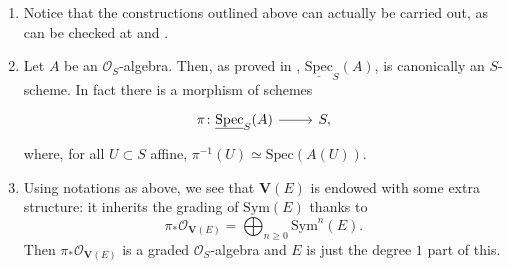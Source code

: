 \begin{rem}[]\leavevmode\vspace{-.2\baselineskip}
\begin{enumerate}
	\item Notice that the constructions outlined above can actually be carried out,
		as can be checked at 
		\cite[\href{https://stacks.math.columbia.edu/tag/01LL}{Section 01LL}]{SP}
		and
		\cite[\href{https://stacks.math.columbia.edu/tag/01M1}{Section 01M1}]{SP}.

	\item Let $A$ be an $\mathcal{O}_{ S }$-algebra. 
		Then, as proved in 
		\cite[\href{https://stacks.math.columbia.edu/tag/01LP}{Lemma 01LP}]{SP},
		$\underline{\mathrm{Spec}}_S(A)$, is canonically an $S$-scheme.
		In fact there is a morphism of schemes
		\begin{equation*}
		\begin{tikzcd}[row sep = 0ex
			,/tikz/column 1/.append style={anchor=base east}
			,/tikz/column 2/.append style={anchor=base west}]
			\pi\colon \underline{\mathrm{Spec}}_S(A)
			\arrow[r, "", rightarrow] &
			S
		,\end{tikzcd}
		\end{equation*} 
		where, for all $U \subset S$ affine, $\pi^{-1}(U) \simeq \mathrm{Spec}(A(U))$.

	\item Using notations as above, we see that $\mathbf{V}(E)$ is endowed with
		some extra structure: it inherits the grading of $\mathrm{Sym}(E)$
		thanks to
		\begin{equation*}
			\pi_* \mathcal{O}_{ \mathbf{V}(E) } =
			\bigoplus_{n \geq 0} \mathrm{Sym}^n(E)
		.\end{equation*}
		Then $\pi_* \mathcal{O}_{ \mathbf{V}(E) }$ is a graded
		$\mathcal{O}_{ S }$-algebra and $E$ is just the degree $1$ part
		of this.
\end{enumerate}
\end{rem}


